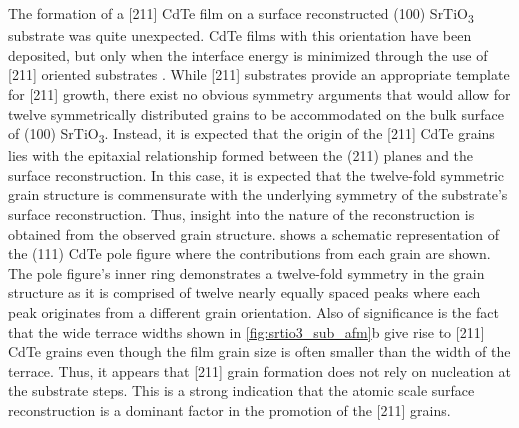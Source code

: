 The formation of a [211] CdTe film on a surface reconstructed
(100) SrTiO\textsubscript{3} substrate was quite unexpected. CdTe films with this
orientation have been deposited, but only when the interface
energy is minimized through the use of [211] oriented substrates
\cite{Lange1991b,Million1996,Rujirawat1997a,Zanatta1998}. While [211] substrates provide an appropriate template
for [211] growth, there exist no obvious symmetry arguments
that would allow for twelve symmetrically distributed grains to be
accommodated on the bulk surface of (100) SrTiO\textsubscript{3}. Instead, it is
expected that the origin of the [211] CdTe grains lies with the
epitaxial relationship formed between the (211) planes and the
surface reconstruction. In this case, it is expected that the twelve-fold symmetric grain structure is commensurate with the underlying symmetry of the substrate’s surface reconstruction. Thus,
insight into the nature of the reconstruction is obtained from the
observed grain structure.  shows a schematic representation
of the (111) CdTe pole figure where the contributions from each
grain are shown. The pole figure’s inner ring demonstrates a
twelve-fold symmetry in the grain structure as it is comprised of twelve nearly equally spaced peaks where each peak originates
from a different grain orientation. Also of significance is the fact
that the wide terrace widths shown in \cref{fig:srtio3_sub_afm}b give rise to [211]
CdTe grains even though the film grain size is often smaller than
the width of the terrace. Thus, it appears that [211] grain
formation does not rely on nucleation at the substrate steps. This is
a strong indication that the atomic scale surface reconstruction is a
dominant factor in the promotion of the [211] grains.

